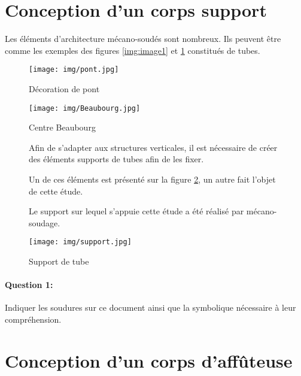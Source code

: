 

\section{Conception d'un corps support}

Les éléments d'architecture mécano-soudés sont nombreux. Ils peuvent être comme les exemples des figures \ref{img:image1} et \ref{img:image2} constitués de tubes.

\begin{figure}[!h]
 \begin{minipage}{0.45\linewidth}
  \centering\texttt{[image: img/pont.jpg]}
  \caption{Décoration de pont}
  \label{img:image1}
\end{minipage}
\hfill
 \begin{minipage}{0.5\linewidth}
  \centering\texttt{[image: img/Beaubourg.jpg]}
  \caption{Centre Beaubourg}
  \label{img:image2}
 \end{minipage}
\end{figure}

\begin{figure}[!h]
 \begin{minipage}{0.58\linewidth}
Afin de s'adapter aux structures verticales, il est nécessaire de créer des éléments supports de tubes afin de les fixer.

Un de ces éléments est présenté sur la figure \ref{img:image3}, un autre fait l'objet de cette étude.

Le support sur lequel s'appuie cette étude a été réalisé par mécano-soudage.
\end{minipage}
\hfill
 \begin{minipage}{0.4\linewidth}
  \centering\texttt{[image: img/support.jpg]}
  \caption{Support de tube}
  \label{img:image3}
 \end{minipage}
\end{figure}

\paragraph{Question 1:} Indiquer les soudures sur ce document ainsi que la symbolique nécessaire à leur compréhension.



\section{Conception d'un corps d’affûteuse}

